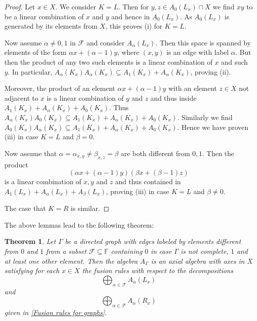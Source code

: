 \documentclass[oneside,a4paper]{amsart} %
\newtheorem{theorem}[proposition]{Theorem}
\theoremstyle{definition}
\begin{document}
\begin{proof}
Let $x\in X$. We consider $K=L$.
Then for $y,z\in A_0(L_x)\cap X$ we find  $xy$ to be a linear combination of $x$ and $y$ and hence in $A_0(L_x)$.
As $A_0(L_x)$ is generated by its elements from $X$, this proves (i) for $K=L$.

Now assume $\alpha\neq 0, 1$ in $\mathcal{F}$ and consider $A_\alpha(L_x)$.
Then this space is spanned by elements of the form $\alpha x+(\alpha-1)y$, where $(x,y)$ is an edge with label $\alpha$.
But then the product of any two such elements is a linear combination
of $x$ and such $y$. In particular, $A_\alpha(K_x)A_\alpha(K_x)\subseteq A_1(K_x)+A_\alpha(K_x)$, proving (ii).

Moreover, the product of an element $\alpha x+(\alpha-1)y$ with an element $z\in X$ not adjacent to $x$ is
a linear combination of $y$ and $z$ and thus inside $A_1(K_x)+A_\alpha(K_x)+A_0(K_x)$.
Thus $A_\alpha(K_x)A_0(K_x)\subseteq A_1(K_x)+A_\alpha(K_x)+A_0(K_x)$.
Similarly we find $A_0(K_x)A_\alpha(K_x)\subseteq A_1(K_x)+A_\alpha(K_x)+A_0(K_x)$. Hence we have proven (iii) in case $K=L$ and $\beta=0$.



Now assume that  $\alpha=\alpha_{x,y}\neq \beta_{x,z}=\beta$ are both different from $0,1$.
Then the product 
$$(\alpha x+(\alpha-1)y)(\beta x+(\beta-1)z)$$
is a linear combination of $x,y$ and $z$ and thus contained in  $A_1(L_x)+A_\alpha(L_x)+A_\beta(L_x)$, proving (iii) in case $K=L$ and $\beta\neq 0$.

The case that $K=R$ is similar.
\end{proof}


The above lemmas lead to the following theorem:

\begin{theorem}\label{fusionthm}
Let 
$\Gamma$ be a directed graph with edges labeled by elements  different from $0$ and $1$ from a subset $\mathcal{F}\subseteq \mathbb{F}$ containing $0$ in case $\Gamma$ is not complete,  $1$ and at least one other element.  
Then the  algebra $A_\Gamma$ is an axial algebra with axes in $X$ satisfying for each $x\in X$ the  fusion rules with  respect to the decompositions
$$\bigoplus_{\alpha\in \mathcal{F}} A_\alpha(L_x)$$
and $$\bigoplus_{\alpha\in \mathcal{F}} A_\alpha(R_x)$$
given in \cref{Fusion rules for graphs}.
\end{theorem}
 
\end{document}
